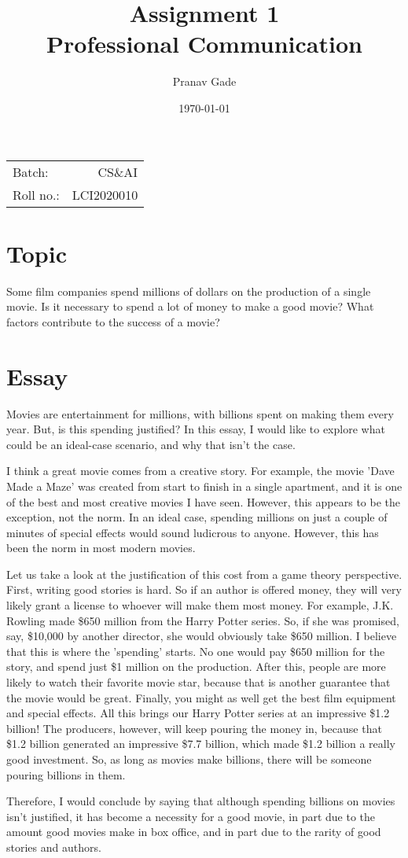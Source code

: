 \documentclass{article}
\title{Assignment 1\\Professional Communication} %
\author{Pranav Gade}
\date{\today} %
\begin{document}
\maketitle %
\begin{center}
	\begin{tabular}{l r}
		Batch: & CS\&AI \\
		Roll no.: & LCI2020010
	\end{tabular}
\end{center}

\section*{Topic}

Some film companies spend millions of dollars on the production of a single movie. Is it necessary to spend a lot of money to make a good movie? What factors contribute to the success of a movie?

\section*{Essay}

Movies are entertainment for millions, with billions spent on making them every year. But, is this spending justified? In this essay, I would like to explore what could be an ideal-case scenario, and why that isn't the case. \par
I think a great movie comes from a creative story. For example, the movie 'Dave Made a Maze' was created from start to finish in a single apartment, and it is one of the best and most creative movies I have seen. However, this appears to be the exception, not the norm. In an ideal case, spending millions on just a couple of minutes of special effects would sound ludicrous to anyone. However, this has been the norm in most modern movies. \par
Let us take a look at the justification of this cost from a game theory perspective. First, writing good stories is hard. So if an author is offered money, they will very likely grant a license to whoever will make them most money. For example, J.K. Rowling made \$650 million from the Harry Potter series. So, if she was promised, say, \$10,000 by another director, she would obviously take \$650 million. I believe that this is where the 'spending' starts. No one would pay \$650 million for the story, and spend just \$1 million on the production. After this, people are more likely to watch their favorite movie star, because that is another guarantee that the movie would be great. Finally, you might as well get the best film equipment and special effects. All this brings our Harry Potter series at an impressive \$1.2 billion! The producers, however, will keep pouring the money in, because that \$1.2 billion generated an impressive \$7.7 billion, which made \$1.2 billion a really good investment. So, as long as movies make billions, there will be someone pouring billions in them. \par
Therefore, I would conclude by saying that although spending billions on movies isn't justified, it has become a necessity for a good movie, in part due to the amount good movies make in box office, and in part due to the rarity of good stories and authors.
\end{document}
